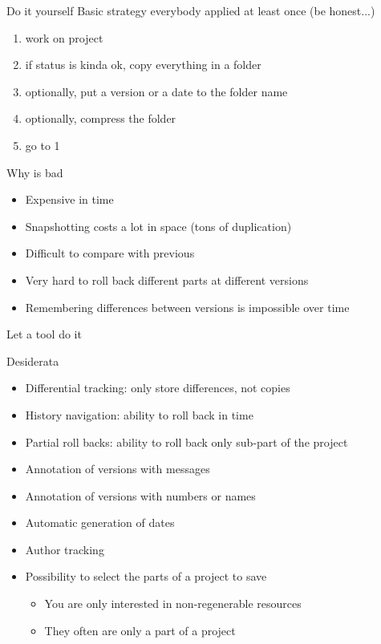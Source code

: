 \documentclass[presentation]{beamer}
\begin{document}
\begin{frame}{Do it yourself}
    Basic strategy everybody applied at least once (be honest...)
    \begin{enumerate}
        \item work on project
        \item if status is kinda ok, copy everything in a folder
        \item optionally, put a version or a date to the folder name
        \item optionally, compress the folder
        \item go to 1
    \end{enumerate}
    \begin{block}{Why is bad}
        \begin{itemize}
            \item Expensive in time
            \item Snapshotting costs a lot in space (tons of duplication) 
            \item Difficult to compare with previous
            \item Very hard to roll back different parts at different versions
            \item Remembering differences between versions is impossible over time
        \end{itemize}
    \end{block}
\end{frame}

\begin{frame}{Let a tool do it}
    \begin{block}{Desiderata}
        \begin{itemize}
            \item Differential tracking: only store differences, not copies
            \item History navigation: ability to roll back in time
            \item Partial roll backs: ability to roll back only sub-part of the project
            \item Annotation of versions with messages
            \item Annotation of versions with numbers or names
            \item Automatic generation of dates
            \item Author tracking
            \item Possibility to select the parts of a project to save
            \begin{itemize}
                \item You are only interested in non-regenerable resources
                \item They often are only a part of a project
            \end{itemize}
        \end{itemize}
    \end{block}
\end{frame}
\end{document}
